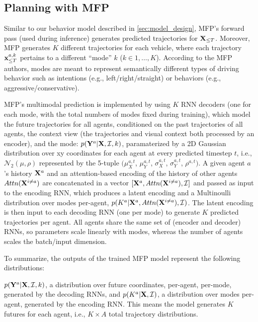 \subsection{Planning with MFP}\label{sec:mfpplanning}

Similar to our behavior model described in \cref{sec:model_design}, MFP's forward pass (used during inference) generates predicted trajectories for $\mathbf{X}_{\leq T}$.
Moreover, MFP generates $K$ different trajectories for each vehicle, where each trajectory $\mathbf{x}_{\leq T}^{a,k}$ pertains to a different ``mode'' $k$ ($k \in 1, \dots, K$). 
According to the MFP authors, modes are meant to represent semantically different types of driving behavior such as intentions (e.g., left/right/straight) or behaviors (e.g., aggressive/conservative). 

MFP's multimodal prediction is implemented by using $K$ RNN decoders (one for each mode, with the total numbers of modes fixed during training), which model the future trajectories for all agents, conditioned on the past trajectories of all agents, the context view (the trajectories and visual context both processed by an encoder), and the mode: 
$p(\mathbf{Y}^a|\mathbf{X},\mathcal{I},k)$, 
paramaterized by a 2D Gaussian distribution over xy coordinates for each agent at every predicted timestep $t$, i.e., $\mathcal{N}_2(\mu,\rho)$ represented by the 5-tuple $(\mu^{a,t}_X$, $\mu^{a,t}_Y$, $\sigma^{a,t}_X$, $\sigma^{a,t}_Y$, $\rho^{a,t})$.
A given agent $a$'s history $\mathbf{X}^a$ and an attention-based encoding of the history of other agents $Attn(\mathbf{X}^{i \neq{} a})$ are concatenated in a vector $[\mathbf{X}^a, Attn(\mathbf{X}^{i \neq{} a}), \mathcal{I}]$ and passed as input to the encoding RNN, which produces a latent encoding and a Multinoulli distribution over modes per-agent, $p(K^a | \mathbf{X}^a, Attn(\mathbf{X}^{i \neq{} a}), \mathcal{I})$. The latent encoding is then input to each decoding RNN (one per mode) to generate $K$ predicted trajectories per agent.
All agents share the same set of (encoder and decoder) RNNs, so parameters scale linearly with modes, whereas the number of agents scales the batch/input dimension.

To summarize, the outputs of the trained MFP model represent the following distributions:

$p(\mathbf{Y}^a | \mathbf{X}, \mathcal{I}, k)$, a distribution over future coordinates, per-agent, per-mode, generated by the decoding RNNs, and $p(K^a | \mathbf{X}, \mathcal{I})$, a distribution over modes per-agent, generated by the encoding RNN. This means the model generates $K$ futures for each agent, i.e., $K \times A$ total trajectory distributions.

